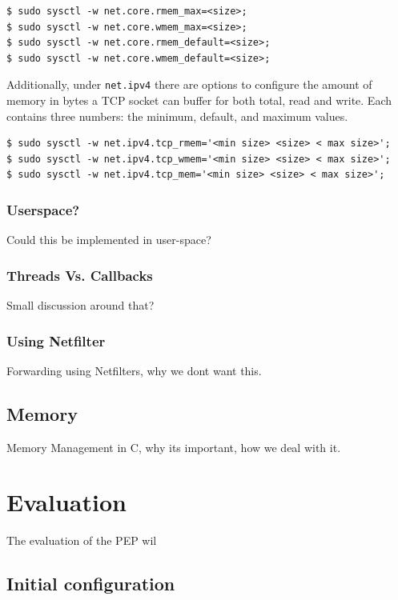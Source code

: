 \documentclass[a4paper,english, 11pt]{report}
\begin{document}
\begin{verbatim}
$ sudo sysctl -w net.core.rmem_max=<size>;
$ sudo sysctl -w net.core.wmem_max=<size>;
$ sudo sysctl -w net.core.rmem_default=<size>;
$ sudo sysctl -w net.core.wmem_default=<size>;
\end{verbatim}

Additionally, under \verb|net.ipv4| there are options to configure the amount of memory in bytes a TCP socket can buffer for both total, read and write. Each contains three numbers: the minimum, default, and maximum values.


\begin{verbatim}
$ sudo sysctl -w net.ipv4.tcp_rmem='<min size> <size> < max size>';
$ sudo sysctl -w net.ipv4.tcp_wmem='<min size> <size> < max size>';
$ sudo sysctl -w net.ipv4.tcp_mem='<min size> <size> < max size>';
\end{verbatim}

\subsection{Userspace?}
Could this be implemented in user-space?

\subsection{Threads Vs. Callbacks}
Small discussion around that?


\subsection{Using Netfilter}
Forwarding using Netfilters, why we dont want this.


\section{Memory}
Memory Management in C, why its important, how we deal with it.

\chapter{Evaluation}
The evaluation of the PEP wil
\section{Initial configuration}
\end{document}
